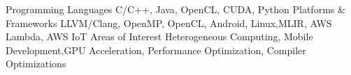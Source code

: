 \begin{cventries}
    \vspace{-2.3em}
    \cvskill
    {Programming Languages}
    {C/C++, Java, OpenCL, CUDA, Python}
    \cvskill
    {Platforms \& Frameworks}
    {LLVM/Clang, OpenMP, OpenCL, Android, Linux,\linebreak MLIR, AWS Lambda, AWS IoT}
    \cvskill
    {Areas of Interest}
    {Heterogeneous Computing, Mobile Development,\linebreak GPU Acceleration, Performance Optimization, \linebreak Compiler Optimizations}
\end{cventries}
